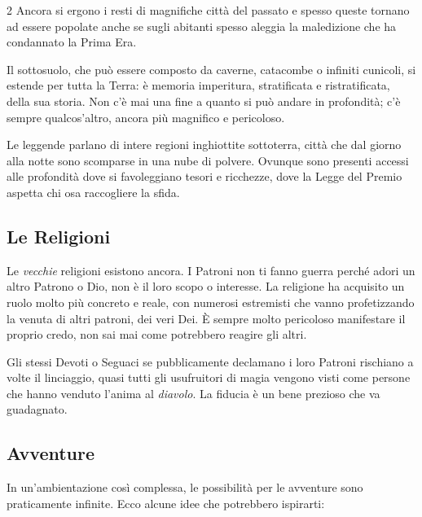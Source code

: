 \begin{multicols}{2}
Ancora si ergono i resti di magnifiche città del passato e spesso queste tornano ad essere popolate anche se sugli abitanti spesso aleggia la maledizione che ha condannato la Prima Era.

Il sottosuolo, che può essere composto da caverne, catacombe o infiniti cunicoli, si estende per tutta la Terra: è memoria imperitura, stratificata e ristratificata, della sua storia. Non c'è mai una fine a quanto si può andare in profondità; c'è sempre qualcos'altro, ancora più magnifico e pericoloso.

Le leggende parlano di intere regioni inghiottite sottoterra, città che dal giorno alla notte sono scomparse in una nube di polvere. Ovunque sono presenti accessi alle profondità dove si favoleggiano tesori e ricchezze, dove la Legge del Premio aspetta chi osa raccogliere la sfida.

\subsection{Le Religioni}

Le \emph{vecchie} religioni esistono ancora. I Patroni non ti fanno guerra perché adori un altro Patrono o Dio, non è il loro scopo o interesse. La religione ha acquisito un ruolo molto più concreto e reale, con numerosi estremisti che vanno profetizzando la venuta di altri patroni, dei veri Dei. È sempre molto pericoloso manifestare il proprio credo, non sai mai come potrebbero reagire gli altri.

Gli stessi Devoti o Seguaci se pubblicamente declamano i loro Patroni rischiano a volte il linciaggio, quasi tutti gli usufruitori di magia vengono visti come persone che hanno venduto l'anima al \emph{diavolo}. La fiducia è un bene prezioso che va guadagnato.

\subsection{Avventure}\label{avventure}

In un'ambientazione così complessa, le possibilità per le avventure sono praticamente infinite. Ecco alcune idee che potrebbero ispirarti:


\end{multicols}
